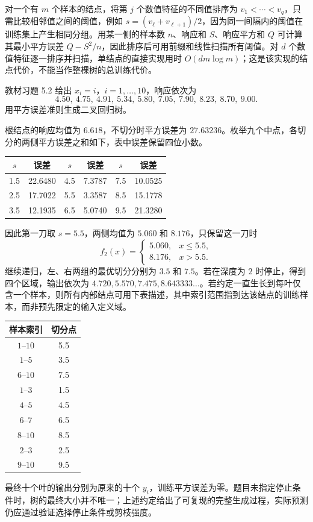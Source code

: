 对一个有 $m$ 个样本的结点，将第 $j$ 个数值特征的不同值排序为 $v_1<\cdots<v_q$，只需比较相邻值之间的阈值，例如 $s=(v_\ell+v_{\ell+1})/2$，因为同一间隔内的阈值在训练集上产生相同分组。用某一侧的样本数 $n$、响应和 $S$、响应平方和 $Q$ 可计算其最小平方误差 $Q-S^2/n$，因此排序后可用前缀和线性扫描所有阈值。对 $d$ 个数值特征逐一排序并扫描，单结点的直接实现用时 $O(dm\log m)$；这是该实现的结点代价，不能当作整棵树的总训练代价。

\begin{example}
\label{ex:lihang-cart-regression-exercise}
教材习题 5.2 给出 $x_i=i$，$i=1,\ldots,10$，响应依次为
\[
  4.50,\ 4.75,\ 4.91,\ 5.34,\ 5.80,\ 7.05,\ 7.90,\ 8.23,\ 8.70,\ 9.00.
\]
用平方误差准则生成二叉回归树。
\end{example}
\begin{solve}
根结点的响应均值为 $6.618$，不切分时平方误差为 $27.63236$。枚举九个中点，各切分的两侧平方误差之和如下，表中误差保留四位小数。
\begin{center}
  \begin{tabular}{cccccc}
    \toprule
    $s$ & 误差 & $s$ & 误差 & $s$ & 误差 \\
    \midrule
    1.5 & 22.6480 & 4.5 & 7.3787 & 7.5 & 10.0525 \\
    2.5 & 17.7022 & 5.5 & 3.3587 & 8.5 & 15.1778 \\
    3.5 & 12.1935 & 6.5 & 5.0740 & 9.5 & 21.3280 \\
    \bottomrule
  \end{tabular}
\end{center}
因此第一刀取 $s=5.5$，两侧均值为 $5.060$ 和 $8.176$，只保留这一刀时
\[
  f_2(x)=
  \begin{cases}
    5.060,&x\leq5.5,\\
    8.176,&x>5.5.
  \end{cases}
\]
继续递归，左、右两组的最优切分分别为 $3.5$ 和 $7.5$。若在深度为 $2$ 时停止，得到四个区域，输出依次为 $4.720,5.570,7.475,8.643333\ldots$。若约定一直生长到每叶仅含一个样本，则所有内部结点可用下表描述，其中索引范围指到达该结点的训练样本，而非预先限定的输入定义域。
\begin{center}
  \begin{tabular}{cc}
    \toprule
    样本索引 & 切分点 \\
    \midrule
    $1$--$10$ & 5.5 \\
    $1$--$5$ & 3.5 \\
    $6$--$10$ & 7.5 \\
    $1$--$3$ & 1.5 \\
    $4$--$5$ & 4.5 \\
    $6$--$7$ & 6.5 \\
    $8$--$10$ & 8.5 \\
    $2$--$3$ & 2.5 \\
    $9$--$10$ & 9.5 \\
    \bottomrule
  \end{tabular}
\end{center}
最终十个叶的输出分别为原来的十个 $y_i$，训练平方误差为零。题目未指定停止条件时，树的最终大小并不唯一；上述约定给出了可复现的完整生成过程，实际预测仍应通过验证选择停止条件或剪枝强度。
\end{solve}

